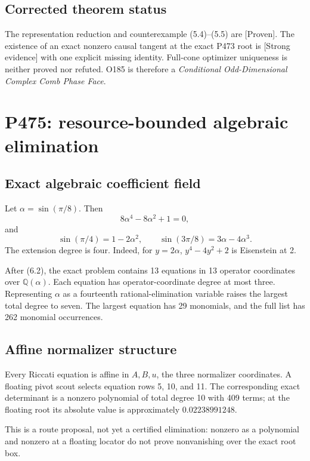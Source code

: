 \documentclass[11pt,a4paper,openany]{report}
\newcommand{\Q}{\mathbb Q}
\newcommand{\statusProven}{\textcolor{fingreen}{[Proven]}}
\newcommand{\statusStrong}{\textcolor{finblue}{[Strong evidence]}}
\begin{document}
\section{Corrected theorem status}

The representation reduction and counterexample (5.4)--(5.5) are
\statusProven{}. The existence of an exact nonzero causal tangent at the exact
P473 root is \statusStrong{} with one explicit missing identity. Full-cone
optimizer uniqueness is neither proved nor refuted. O185 is therefore a
\emph{Conditional Odd-Dimensional Complex Comb Phase Face}.

\chapter{P475: resource-bounded algebraic elimination}

\section{Exact algebraic coefficient field}

Let \(\alpha=\sin(\pi/8)\). Then
\[
 8\alpha^4-8\alpha^2+1=0,                                        \tag{6.1}
\]
and
\[
 \sin(\pi/4)=1-2\alpha^2,
 \qquad
 \sin(3\pi/8)=3\alpha-4\alpha^3.                                \tag{6.2}
\]
The extension degree is four. Indeed, for \(y=2\alpha\),
\(y^4-4y^2+2\) is Eisenstein at 2.

After (6.2), the exact problem contains 13 equations in 13 operator
coordinates over \(\Q(\alpha)\). Each equation has operator-coordinate degree
at most three. Representing \(\alpha\) as a fourteenth rational-elimination
variable raises the largest total degree to seven. The largest equation has
29 monomials, and the full list has 262 monomial occurrences.

\section{Affine normalizer structure}

Every Riccati equation is affine in \(A,B,u\), the three normalizer
coordinates. A floating pivot scout selects equation rows 5, 10, and 11. The
corresponding exact determinant is a nonzero polynomial of total degree 10
with 409 terms; at the floating root its absolute value is approximately
\(0.02238991248\).

This is a route proposal, not yet a certified elimination: nonzero as a
polynomial and nonzero at a floating locator do not prove nonvanishing over
the exact root box.
\end{document}
